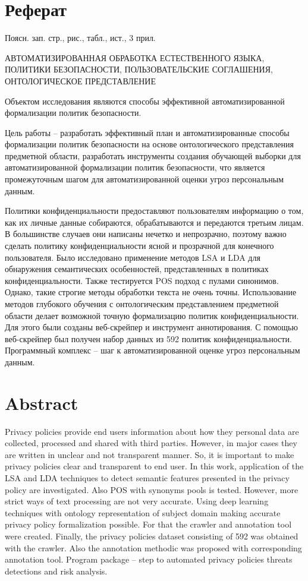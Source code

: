 \documentclass[../main]{subfiles}
\begin{document}
\newpage
{}
\section*{Реферат}
Поясн. зап.  стр.,   рис.,  табл.,  ист., 3 прил.

\begin{jje}
    \MakeUppercase{автоматизированная обработка естественного языка, политики безопасности, пользовательские соглашения, онтологическое представление}
\end{jje}

Объектом  исследования являются способы эффективной автоматизированной формализации политик безопасности.

Цель работы -- разработать эффективный план и автоматизированные способы формализации политик безопасности на основе онтологического представления предметной области, разработать инструменты создания обучающей выборки для автоматизированной формализации политик безопасности, что является промежуточным шагом для автоматизированной оценки угроз персональным данным.

Политики конфиденциальности предоставляют пользователям информацию о том, как их личные данные собираются, обрабатываются и передаются третьим лицам. В большинстве случаев они написаны нечетко и непрозрачно, поэтому важно сделать политику конфиденциальности ясной и прозрачной для конечного пользователя. Было исследовано применение методов LSA и LDA для обнаружения семантических особенностей, представленных в политиках конфиденциальности. Также тестируется POS подход с пулами синонимов. Однако, такие строгие методы обработки текста не очень точны. Использование методов глубокого обучения с онтологическим представлением предметной области делает возможной точную формализацию политик конфиденциальности. Для этого были созданы веб-скрейпер и инструмент аннотирования. С помощью веб-скрейпер был получен набор данных из 592 политик конфиденциальности. Программный комплекс -- шаг к автоматизированной оценке угроз персональным данным.

\newpage
\section*{Abstract}
Privacy policies provide end users information about how they personal data are collected, processed and shared with third parties. However, in major cases they are written in unclear and not transparent manner. So, it is important to make privacy  policies clear and transparent to end user. In this work, application of the LSA and LDA techniques to detect semantic features presented in the privacy policy are investigated. Also POS with synonyms pools is tested. However, more strict ways of text processing are not very accurate. Using deep learning techniques with ontology representation of subject domain making accurate privacy policy formalization possible. For that the crawler and annotation tool were created. Finally, the privacy policies dataset consisting of 592 was obtained with the crawler. Also the annotation methodic was proposed with corresponding annotation tool. Program package -- step to automated privacy policies threats detections and risk analysis.
\end{document}
